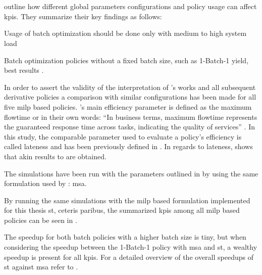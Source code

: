 \section{}
\label{sec:opt_results}

\citet[pp. 18--22]{Zeng2005} outline how different global parameters configurations and policy usage can affect \glspl{kpi}. They summarize their key findings as follows:
\begin{enumerate*}
	\item Usage of batch optimization should be done only with medium to high system load \citep[p. 24]{Zeng2005}
	\item Batch optimization policies without a fixed batch size, such as 1-Batch-1 yield, best results \citep[p. 24]{Zeng2005}.
\end{enumerate*}

In order to assert the validity of the interpretation of \citet{Zeng2005}'s works and all subsequent derivative policies a comparison with similar configurations has been made for all five \gls{milp} based policies. \citet{Zeng2005}'s main efficiency parameter is defined as the maximum flowtime or in their own words: ``In business terms, maximum flowtime represents the guaranteed response time across tasks, indicating the quality of services'' \citep[p. 17]{Zeng2005}. In this study, the comparable parameter used to evaluate a policy's efficiency is called lateness and has been previously defined in . In regards to lateness,  shows that akin results to \citet{Zeng2005} are obtained.


The simulations have been run with the parameters outlined in  by using the same formulation used by \citet{Zeng2005}: \gls{msa}.

By running the same simulations with the \gls{milp} based formulation implemented for this thesis \ie \gls{st}, ceteris paribus, the summarized \glspl{kpi} among all \gls{milp} based policies can be seen in .


The speedup for both batch policies with a higher batch size is tiny, but when considering the speedup between the 1-Batch-1 policy with \gls{msa} and \gls{st}, a wealthy speedup is present for all \glspl{kpi}. For a detailed overview of the overall speedups of \gls{st} against \gls{msa} refer to .

